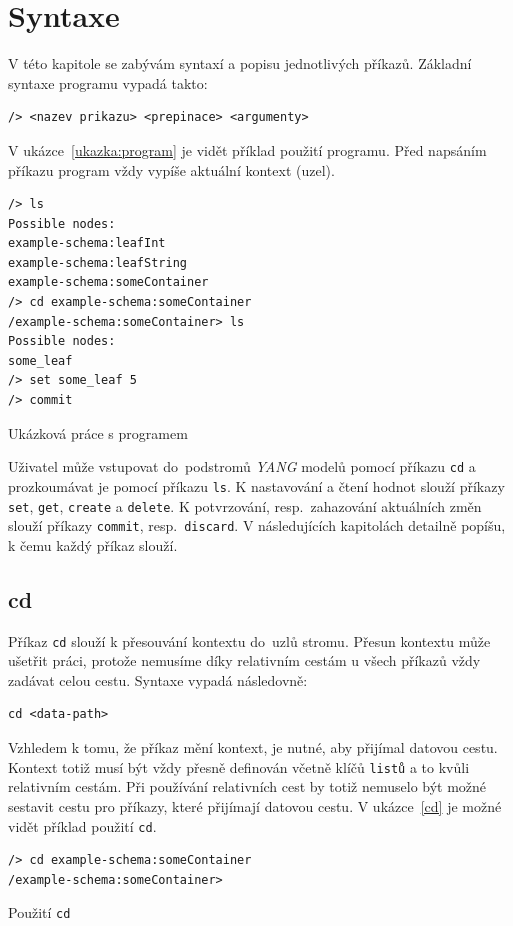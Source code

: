 \documentclass[thesis=B,czech,hidelinks]{FITthesis}[2019/03/06]
\begin{document}
\section{Syntaxe}\label{syntaxe}
V této kapitole se zabývám syntaxí a popisu jednotlivých příkazů. Základní syntaxe programu vypadá takto:
\begin{verbatim}
/> <nazev prikazu> <prepinace> <argumenty>
\end{verbatim}
V ukázce~\ref{ukazka:program} je vidět příklad použití programu. Před napsáním příkazu program vždy vypíše aktuální kontext (uzel).

\begin{listing}[H]
\begin{verbatim}
/> ls
Possible nodes:
example-schema:leafInt
example-schema:leafString
example-schema:someContainer
/> cd example-schema:someContainer
/example-schema:someContainer> ls
Possible nodes:
some_leaf
/> set some_leaf 5
/> commit
\end{verbatim}
\caption{Ukázková práce s programem}\label{ukazka:program}
\end{listing}

Uživatel může vstupovat do~podstromů \textit{YANG} modelů pomocí příkazu \texttt{cd} a prozkoumávat je pomocí příkazu \texttt{ls}. K nastavování a čtení hodnot slouží příkazy \texttt{set}, \texttt{get}, \texttt{create} a \texttt{delete}. K potvrzování, resp.\ zahazování aktuálních změn slouží příkazy \texttt{commit}, resp.\ \texttt{discard}. V následujících kapitolách detailně popíšu, k čemu každý příkaz slouží.

\subsection{cd}
Příkaz \texttt{cd} slouží k přesouvání kontextu do~uzlů stromu. Přesun kontextu může ušetřit práci, protože nemusíme díky relativním cestám u všech příkazů vždy zadávat celou cestu. Syntaxe vypadá následovně:
\begin{verbatim}
cd <data-path>
\end{verbatim}
Vzhledem k tomu, že příkaz mění kontext, je nutné, aby přijímal datovou cestu. Kontext totiž musí být vždy přesně definován včetně klíčů \texttt{listů} a to kvůli relativním cestám. Při používání relativních cest by totiž nemuselo být možné sestavit cestu pro příkazy, které přijímají datovou cestu. V ukázce~\ref{cd} je možné vidět příklad použití \texttt{cd}.

\begin{listing}[H]
\begin{verbatim}
/> cd example-schema:someContainer
/example-schema:someContainer>
\end{verbatim}
\caption{Použití \texttt{cd}}\label{cd}
\end{listing}
\end{document}
